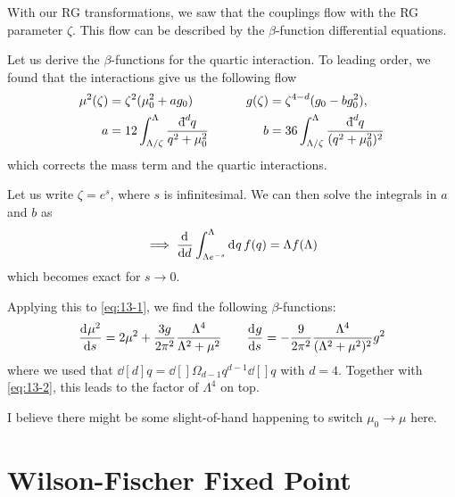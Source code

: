 
With our RG transformations, we saw that the couplings flow with the RG parameter $\zeta$. This flow can be described by the $\beta$-function differential equations.

Let us derive the $\beta$-functions for the quartic interaction.
To leading order, we found that the interactions give us the following flow
\begin{align}
  \label{eq:13-1}
  \mu^2(\zeta) &= \zeta^2 (\mu_0^2 + a g_0) \qquad & g(\zeta) &= \zeta^{4 - d}(g_0 - b g_0^2), \\
  a &= 12 \int_{\Lambda/\zeta}^{\Lambda} \frac{\bdd[d]{q}}{q^2 + \mu_0^2} \qquad & b &= 36 \int_{\Lambda/\zeta}^{\Lambda}\frac{\bdd[d]{q}}{(q^2 + \mu_0^2)^2}
\end{align}
which corrects the mass term and the quartic interactions.

Let us write $\zeta = e^{s}$, where $s$ is infinitesimal.
We can then solve the integrals in $a$ and $b$ as
\begin{equation}
  \label{eq:13-2}
  \implies \dv[]{}{d} \int_{\Lambda e^{-s}}^\Lambda \dd[]{q} f(q) = \Lambda f(\Lambda)
\end{equation}
which becomes exact for $s \to 0$.

Applying this to \eqref{eq:13-1}, we find the following $\beta$-functions:
\begin{equation}
  \label{eq:beta-functions}
  \dv[]{\mu^2}{s} = 2 \mu^2 + \frac{3g}{2\pi^2} \frac{\Lambda^4}{\Lambda^2 + \mu^2} \qquad
  \dv[]{g}{s} = -\frac{9}{2\pi^2} \frac{\Lambda^4}{(\Lambda^2 + \mu^2)^2} g^2
\end{equation}
where we used that $\dd[d]{q} = \dd[]{\Omega_{d-1}} q^{d-1} \dd[]{q}$ with $d = 4$. Together with \eqref{eq:13-2}, this leads to the factor of $\Lambda^4$ on top.

\begin{leftbar}
  \begin{remark}
    I believe there might be some slight-of-hand happening to switch $\mu_0 \to \mu$ here.
  \end{remark}
\end{leftbar}

\section{Wilson-Fischer Fixed Point}%
\label{sec:wilson_fischer_fixed_point}

